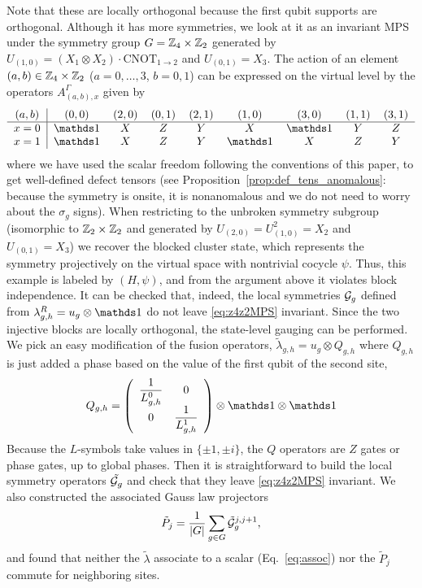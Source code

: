 \documentclass[reprint,
superscriptaddress,
amsmath,amssymb,
notitlepage,
aps,
prb,
10pt, 
tightenlines
]{revtex4-2}
\begin{document}
Note that these are locally orthogonal because the first qubit supports are orthogonal. Although it has more symmetries, we look at it as an invariant MPS under the symmetry group $G=\mathbb{Z}_4\times \mathbb{Z}_2$ generated by $U_{(1,0)}=(X_1\otimes X_2)\cdot \mathrm{CNOT}_{1\rightarrow 2}$ and $U_{(0,1)}=X_3$. The action of an element $(a,b)\in \mathbb{Z}_4\times\mathbb{Z}_2$ ($a=0,\ldots,3$, $b=0,1$) can be expressed on the virtual level by the operators $A^\Gamma_{(a, b),x}$ given by
\begin{equation*}
    \begin{tabular}{c|c c c c c c c c}
     $(a,b)$ & $(0,0)$ & $(2,0)$ & $(0,1)$ & $(2,1)$ & $(1,0)$ & $(3,0)$ & $(1,1)$ & $(3,1)$ \\\hline
       $x=0$ & $\I$ & $X$ & $Z$ & $Y$ & $X$ & $\I$ & $Y$ & $Z$ \\
       $x=1$ & $\I$ & $X$ & $Z$ & $Y$ & $\I$ & $X$ & $Z$ & $Y$ \\
    \end{tabular}
\end{equation*}
where we have used the scalar freedom following the conventions of this paper, to get well-defined defect tensors (see Proposition~\ref{prop:def_tens_anomalous}: because the symmetry is onsite, it is nonanomalous and we do not need to worry about the $\sigma_g$ signs). When restricting to the unbroken symmetry subgroup (isomorphic to $\mathbb{Z}_2\times\mathbb{Z}_2$ and generated by $U_{(2,0)} = U^2_{(1,0)}=X_2$ and $U_{(0,1)}=X_3$) we recover the blocked cluster state, which represents the symmetry projectively on the virtual space with nontrivial cocycle $\psi$. Thus, this example is labeled by $(H, \psi)$, and from the argument above it violates block independence. It can be checked that, indeed, the local symmetries $\mathcal{G}_g$ defined from $\lambda^R_{g,h}=u_g\otimes\I$ do not leave \eqref{eq:z4z2MPS} invariant. Since the two injective blocks are locally orthogonal, the state-level gauging can be performed. We pick an easy modification of the fusion operators, $\tilde\lambda_{g,h}=u_g\otimes Q_{g,h}$ where $Q_{g,h}$ is just added a phase based on the value of the first qubit of the second site,
\begin{equation}
Q_{g,h}=\left(\begin{array}{cc}
    \dfrac{1}{L^{0}_{g,h}} & 0 \\
    0 & \dfrac{1}{L^{1}_{g,h}}
\end{array}\right)\otimes \I\otimes \I
\end{equation}
Because the $L$-symbols take values in $\{\pm1, \pm i\}$, the $Q$ operators are $Z$ gates or phase gates, up to global phases. Then it is straightforward to build the local symmetry operators $\tilde{\mathcal{G}_g}$ and check that they leave \eqref{eq:z4z2MPS} invariant. We also constructed the associated Gauss law projectors
\begin{equation}
    \tilde P_j=\dfrac{1}{|G|}\sum_{g\in G}{\tilde{\mathcal{G}}_g^{j,j+1}},
    \label{eq:gauge_projs_modif}
\end{equation}
and found that neither the $\tilde\lambda$ associate to a scalar (Eq.~\eqref{eq:assoc}) nor the $\tilde P_j$ commute for neighboring sites. 
\end{document}
